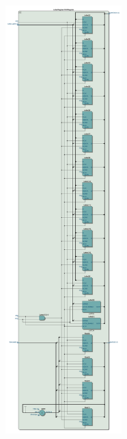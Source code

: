 \documentclass{article}
\begin{document}
\clearpage

\begin{figure}[h]
    \centering
    \includegraphics[width=0.4\textwidth]{Figures/RTL_Register.jpg}
    \label{fig:RTL_Reg}
\end{figure}

\clearpage
\end{document}
